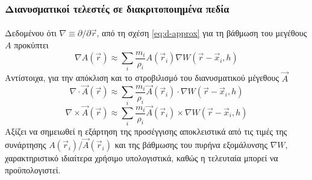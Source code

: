 \subsubsection{Διανυσματικοί τελεστές σε διακριτοποιημένα πεδία}
\label{sssec:vector-calc}
\paragraph{} Δεδομένου ότι $\nabla \equiv \partial/\partial\vec{r}$,
από τη σχέση \ref{eq:d-approx} για τη βάθμωση του μεγέθους $A$ προκύπτει
\begin{equation}
  \label{eq:d-grad}
  \nabla A(\vec{r}) \approx \sum_i \frac{m_i}{\rho_i} A(\vec{r}_i) \nabla W(\vec{r} - \vec{x}_i, h)
\end{equation}
Αντίστοιχα, για την απόκλιση και το στροβιλισμό του διανυσματικού μέγεθους $\vec{A}$
\begin{equation}
  \label{eq:d-div}
  \nabla \cdot \vec{A}(\vec{r}) \approx \sum_i \frac{m_i}{\rho_i} \vec{A}(\vec{r}_i)
  \cdot \nabla W(\vec{r} - \vec{x}_i, h)
\end{equation}
\begin{equation}
  \label{eq:d-curl}
  \nabla \times \vec{A}(\vec{r}) \approx \sum_i \frac{m_i}{\rho_i} \vec{A}(\vec{r}_i)
  \times \nabla W(\vec{r} - \vec{x}_i, h)
\end{equation}
Αξίζει να σημειωθεί η εξάρτηση της προσέγγισης αποκλειστικά από τις τιμές της συνάρτησης
$A(\vec{r}_i)$/$\vec{A}(\vec{r}_i)$ και της βάθμωσης του πυρήνα εξομάλυνσης $\nabla W$,
χαρακτηριστικό ιδιαίτερα χρήσιμο υπολογιστικά, καθώς η τελευταία μπορεί να προϋπολογιστεί.

